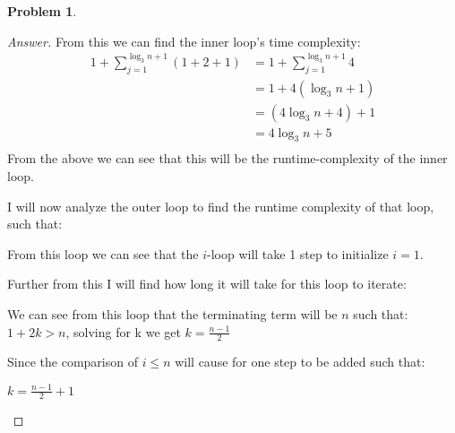 \documentclass[11pt]{article}
\theoremstyle{definition}
\theoremstyle{definition}
\newtheorem{required}{Problem}
\theoremstyle{definition}
\begin{document}
\begin{required}
\begin{proof}[Answer]
From this we can find the inner loop's time complexity: \\
\begin{align*}
1 + \sum_{j=1}^{\log_3 n + 1} (1 + 2 + 1) &= 1 + \sum_{j=1}^{\log_3 n + 1}  4 \\
&= 1 + 4(\log_3 n + 1) \\
&= (4\log_3 n + 4) + 1 \\
&= 4\log_3 n + 5 \\
\end{align*}
From the above we can see that this will be the runtime-complexity of the inner loop.

I will now analyze the outer loop to find the runtime complexity of that loop, such that:\\
\begin{center}
From this loop we can see that the $i$-loop will take 1 step to initialize $i=1$. \\
\end{center}
Further from this I will find how long it will take for this loop to iterate: \\
\begin{center}
We can see from this loop that the terminating term will be $n$ such that: \\
$1+2k > n$, solving for k we get $k = \frac{n-1}{2}$
\end{center}
Since the comparison of $i\leq n$ will cause for one step to be added such that: \\
\begin{center}
$k = \frac{n-1}{2} + 1$
\end{center}
\end{proof}


\end{required}
\end{document}
